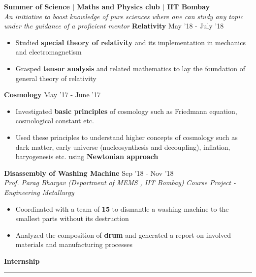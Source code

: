 \documentclass[8pt]{article}%
\begin{document}
{{\flushleft \bf \large{Summer of Science $|$ Maths and Physics club $|$ IIT Bombay}}\\
{\em An initiative to boost knowledge of pure sciences where one can study any topic under the guidance of a proficient mentor
}
{\flushleft \bf {Relativity}} \hfill{{{May '18 - July '18}}} \\
\begin{itemize}
    \setlength\itemsep{0.01em}
	\vspace{-5mm}
    \item Studied {\bf special theory of relativity} and its implementation in mechanics and electromagnetism
    \item Grasped {\bf tensor analysis} and related mathematics to lay the foundation of general theory of relativity 
\end{itemize}

{\flushleft \bf {Cosmology}} \hfill{{{May '17 - June '17}}} \\
\begin{itemize}
    \setlength\itemsep{0.01em}
    \vspace{-5mm}
    \item Investigated {\bf basic principles} of cosmology such as Friedmann equation, cosmological constant etc.
    \item Used these principles to understand higher concepts of cosmology such as dark matter, early universe (nucleosynthesis and decoupling), inflation, baryogenesis etc. using {\bf Newtonian approach}
\end{itemize}

{\flushleft \bf \large{Disassembly of Washing Machine}} \hfill {{{Sep '18 - Nov '18} }} \\
{\em Prof. Parag Bhargav (Department of MEMS
, IIT Bombay)} \hfill{\em Course Project - Engineering Metallurgy}
\begin{itemize}
\setlength\itemsep{0.01em}
 \item Coordinated with a team of {\bf 15} to dismantle a washing machine to the smallest parts without its destruction
 \item Analyzed the composition of {\bf drum} and generated a report on involved materials and manufacturing processes

\end{itemize}

\newpage
\begin{flushleft}
\bf{\Large{Internship}}
\end{flushleft}
\vspace{-2mm}
\hrule

}
\end{document}
